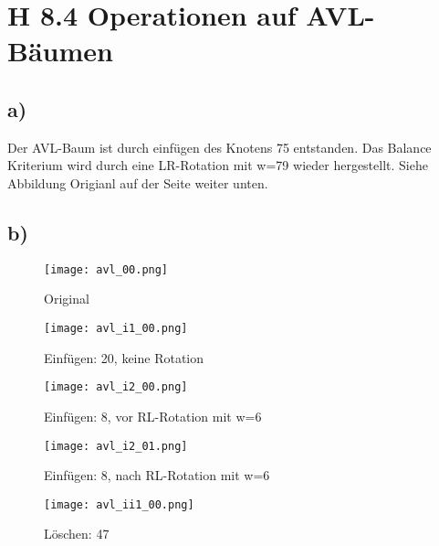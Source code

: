 \documentclass[a4paper]{article}
\begin{document}
\section*{H 8.4 Operationen auf AVL-Bäumen}

\subsection*{a)}

Der AVL-Baum ist durch einfügen des Knotens 75 entstanden. Das Balance
Kriterium wird durch eine LR-Rotation mit w=79 wieder hergestellt.
Siehe Abbildung Origianl auf der Seite weiter unten.

\subsection*{b)}

\begin{figure}[!h]
	\begin{center}
		\texttt{[image: avl\_00.png]}
	\end{center}
	\caption{Original}
	\label{fig:original}
\end{figure}

\begin{figure}[!h]
	\begin{center}
		\texttt{[image: avl\_i1\_00.png]}
	\end{center}
	\caption{Einfügen: 20, keine Rotation}
	\label{fig:avl_i1_00}
\end{figure}

\begin{figure}[!h]
	\begin{center}
		\texttt{[image: avl\_i2\_00.png]}
	\end{center}
	\caption{Einfügen: 8, vor RL-Rotation mit w=6}
	\label{fig:avl_i2_00}
\end{figure}

\begin{figure}[!h]
	\begin{center}
		\texttt{[image: avl\_i2\_01.png]}
	\end{center}
	\caption{Einfügen: 8, nach RL-Rotation mit w=6}
	\label{fig:avl_i2_01}
\end{figure}

\begin{figure}[!h]
	\begin{center}
		\texttt{[image: avl\_ii1\_00.png]}
	\end{center}
	\caption{Löschen: 47}
	\label{fig:avl_ii1_00}
\end{figure}
\end{document}
